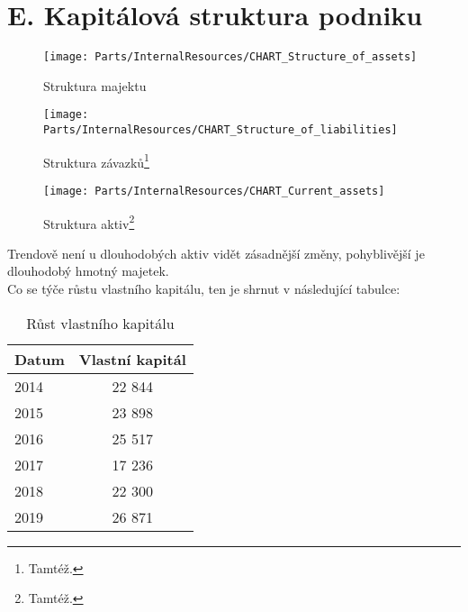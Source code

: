 


\newpage

\section*{E. Kapitálová struktura podniku}
\label{sec:Kapitalova struktura podniku}

\begin{figure}[!htbp]
  \centering
  \begin{minipage}[b]{0.49\textwidth}
    \texttt{[image: Parts/InternalResources/CHART\_Structure\_of\_assets]}
    \caption[Struktura majektu]{Struktura majektu}
    \label{fig:Struktura majetku}
  \end{minipage}
  \hfill
  \begin{minipage}[b]{0.49\textwidth}
    \texttt{[image: Parts/InternalResources/CHART\_Structure\_of\_liabilities]}
    \caption[Struktura závazků]{Struktura závazků\footnote{Tamtéž.}}
    \label{fig:Struktura zavazku}
  \end{minipage}
\end{figure}

\newpage

\begin{figure}[!hbtp]
	\centering
	\texttt{[image: Parts/InternalResources/CHART\_Current\_assets]}
	\caption[Struktura aktiv]{Struktura aktiv\footnote{Tamtéž.}}
	\label{fig:Struktura aktiv}
\end{figure}

Trendově není u dlouhodobých aktiv vidět zásadnější změny, pohyblivější je dlouhodobý hmotný majetek.\\

Co se týče růstu vlastního kapitálu, ten je shrnut v následující tabulce:

\begin{table}[!hbtp]
\centering
\begin{tabular}{|l|c|}
\hline
Datum & Vlastní kapitál \\
\hline
2014 & 22 844 \\
\hline
2015 & 23 898 \\
\hline
2016 & 25 517 \\
\hline
2017 & 17 236 \\
\hline
2018 & 22 300 \\
\hline
2019 & 26 871 \\
\hline
\end{tabular}
\caption[Růst vlastního kapitálu]{Růst vlastního kapitálu}
\label{tab:Rust vlastniho kapitalu}
\end{table}

